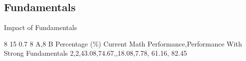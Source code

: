 \label{2.2 C8 A,8 BM Impact of Fundamentals}
\subsection{Fundamentals}
\renewcommand{\insertclass}{ - Class 8 A,8 B }
\renewcommand{\insertsubject}{- Math}

\begin{frame}{Impact of Fundamentals}


\centering
\impactOfFundamentals
    {8}
    {15}
    {0.7}
    {8 A,8 B}
    {Percentage (\%)}
    {Current Math Performance,Performance With Strong Fundamentals}
    {
        {2},{2},{43.08,74.67,},{18.08,7.78,}
    }
    {}
    {{61.16, 82.45}}


\end{frame}


%


        



